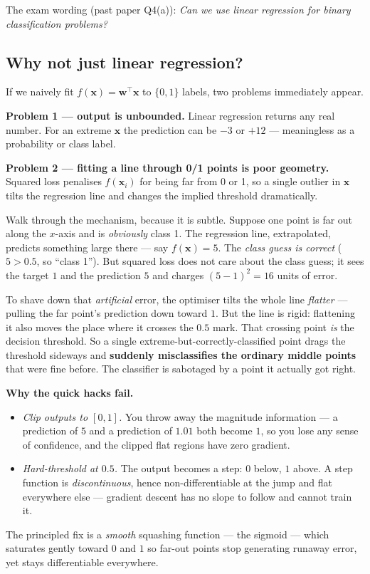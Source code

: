 \documentclass[11pt, a4paper]{article}
\begin{document}
The exam wording (past paper Q4(a)): \emph{Can we use linear regression for binary classification problems?}

\subsection{Why not just linear regression?}

If we naively fit $f(\mathbf{x}) = \mathbf{w}^\top\mathbf{x}$ to $\{0,1\}$ labels, two problems immediately appear.

\textbf{Problem 1 — output is unbounded.} Linear regression returns any real number. For an extreme $\mathbf{x}$ the prediction can be $-3$ or $+12$ — meaningless as a probability or class label.

\textbf{Problem 2 — fitting a line through 0/1 points is poor geometry.} Squared loss penalises $f(\mathbf{x}_i)$ for being far from 0 or 1, so a single outlier in $\mathbf{x}$ tilts the regression line and changes the implied threshold dramatically.

\begin{pitfallbox}
Walk through the mechanism, because it is subtle. Suppose one point is far out along the $x$-axis and is \emph{obviously} class 1. The regression line, extrapolated, predicts something large there --- say $f(\mathbf{x}) = 5$. The \emph{class guess is correct} ($5 > 0.5$, so ``class 1''). But squared loss does not care about the class guess; it sees the target $1$ and the prediction $5$ and charges $(5-1)^2 = 16$ units of error.

To shave down that \emph{artificial} error, the optimiser tilts the whole line \emph{flatter} --- pulling the far point's prediction down toward $1$. But the line is rigid: flattening it also moves the place where it crosses the $0.5$ mark. That crossing point \emph{is} the decision threshold. So a single extreme-but-correctly-classified point drags the threshold sideways and \textbf{suddenly misclassifies the ordinary middle points} that were fine before. The classifier is sabotaged by a point it actually got right.

\textbf{Why the quick hacks fail.}
\begin{itemize}
  \item \emph{Clip outputs to $[0,1]$.} You throw away the magnitude information --- a prediction of $5$ and a prediction of $1.01$ both become $1$, so you lose any sense of confidence, and the clipped flat regions have zero gradient.
  \item \emph{Hard-threshold at $0.5$.} The output becomes a step: $0$ below, $1$ above. A step function is \emph{discontinuous}, hence non-differentiable at the jump and flat everywhere else --- gradient descent has no slope to follow and cannot train it.
\end{itemize}
The principled fix is a \emph{smooth} squashing function --- the sigmoid --- which saturates gently toward $0$ and $1$ so far-out points stop generating runaway error, yet stays differentiable everywhere.
\end{pitfallbox}
\end{document}
